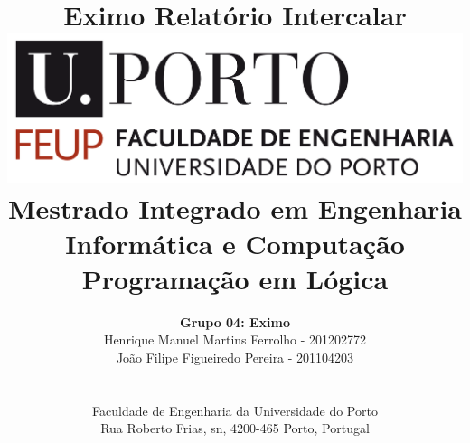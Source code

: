 \documentclass[a4paper]{article}
\begin{document}
\lstset{breaklines=true, language=Prolog, showstringspaces=false}

\setlength{\textwidth}{16cm}
\setlength{\textheight}{22cm}

\title{\Huge\textbf{Eximo}\linebreak\linebreak\linebreak
\Large\textbf{Relatório Intercalar}\linebreak\linebreak
\linebreak\linebreak
\includegraphics[scale=0.1]{res/feup-logo.png}\linebreak\linebreak
\linebreak\linebreak
\Large{Mestrado Integrado em Engenharia Informática e Computação} \linebreak\linebreak
\Large{Programação em Lógica}\linebreak
}

\author{\textbf{Grupo 04: Eximo}\\
Henrique Manuel Martins Ferrolho -  201202772\\
João Filipe Figueiredo Pereira - 201104203 \\
\linebreak\linebreak \\
 \\ Faculdade de Engenharia da Universidade do Porto \\ Rua Roberto Frias, s\/n, 4200-465 Porto, Portugal \linebreak\linebreak\linebreak
\linebreak\linebreak\vspace{1cm}}

\maketitle
\thispagestyle{empty}
\end{document}

